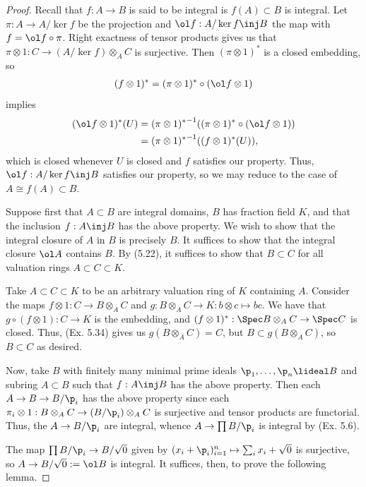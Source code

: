 \documentclass[12pt]{amsart}
\begin{document}
\begin{proof}
  Recall that $f:A\to B$ is said to be integral is $f(A)\subset B$ is integral.
  Let $\pi:A\to A/\ker f$ be the projection and $\ol f:A/\ker f\inj B$ the map with $f=\ol f\circ \pi$.
  Right exactness of tensor products gives us that $\pi\otimes 1:C\to (A/\ker f)\otimes_A C$ is surjective.
  Then $(\pi\otimes 1)^*$ is a closed embedding, so
  \begin{align*}
    (f\otimes 1)^* = (\pi\otimes 1)^*\circ(\ol f\otimes 1)
  \end{align*}
  implies
  \begin{align*}
    (\ol f\otimes 1)^*(U) 
    &= {(\pi\otimes 1)^*}^{-1}((\pi\otimes 1)^*\circ(\ol f\otimes 1)) \\
    &= {(\pi\otimes 1)^*}^{-1}((f\otimes 1)^*(U)),
  \end{align*}
  which is closed whenever $U$ is closed and $f$ satisfies our property.
  Thus, $\ol f:A/\ker f\inj B$ satisfies our property, so we may reduce to the case of $A\cong f(A)\subset B$.

  Suppose first that $A\subset B$ are integral domains, $B$ has fraction field $K$, and that the inclusion $f:A\inj B$ has the above property.
  We wish to show that the integral closure of $A$ in $B$ is precisely $B$.
  It suffices to show that the integral closure $\ol A$ contains $B$.
  By (5.22), it suffices to show that $B\subset C$ for all valuation rings $A\subset C\subset K$.

  Take $A\subset C\subset K$ to be an arbitrary valuation ring of $K$ containing $A$.
  Consider the maps $f\otimes 1:C\to B\otimes_A C$ and $g:B\otimes_A C\to K:b\otimes c\mapsto bc$.
  We have that $g\circ (f\otimes 1):C\to K$ is the embedding, and $(f\otimes 1)^*:\Spec B\otimes_AC\to \Spec C$ is closed.
  Thus, (Ex. 5.34) gives us $g(B\otimes_A C)= C$, but $B\subset g(B\otimes_A C)$, so $B\subset C$ as desired.

  Now, take $B$ with finitely many minimal prime ideals $\p_1,\ldots, \p_n\lideal B$ and subring $A\subset B$ such that $f:A\inj B$ has the above property.
  Then each $A\to B\to B/\p_i$ has the above property since each $\pi_i\otimes 1:B\otimes_A C\to (B/\p_i)\otimes_A C$ is surjective and tensor products are functorial.
  Thus, the $A\to B/\p_i$ are integral, whence $A\to \prod B/\p_i$ is integral by (Ex. 5.6).
  
  The map $\prod B/\p_i\to B/\sqrt{0}$ given by $(x_i+\p_i)_{i=1}^n\mapsto \sum_ix_i +\sqrt{0}$ is surjective, so $A\to B/\sqrt{0}:= \ol B$ is integral.
  It suffices, then, to prove the following lemma.


\end{proof}
\end{document}
